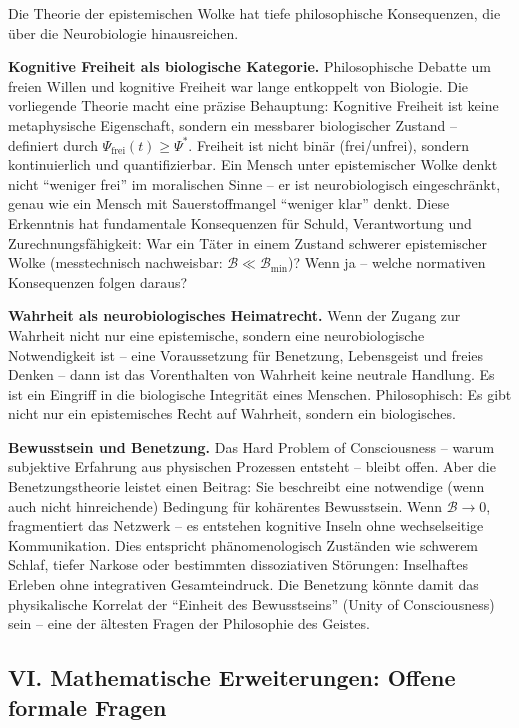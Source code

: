 ﻿\documentclass[12pt,a4paper]{report}
\theoremstyle{plain}
\theoremstyle{definition}
\theoremstyle{remark}
\begin{document}
	Die Theorie der epistemischen Wolke hat tiefe philosophische
	Konsequenzen, die über die Neurobiologie hinausreichen.

	\textbf{Kognitive Freiheit als biologische Kategorie.}
	Philosophische Debatte um freien Willen und kognitive Freiheit
	war lange entkoppelt von Biologie.
	Die vorliegende Theorie macht eine präzise Behauptung:
	Kognitive Freiheit ist keine metaphysische Eigenschaft,
	sondern ein messbarer biologischer Zustand -- definiert durch
	$\Psi_{\mathrm{frei}}(t) \geq \Psi^*$.
	Freiheit ist nicht binär (frei/unfrei), sondern kontinuierlich
	und quantifizierbar. Ein Mensch unter epistemischer Wolke
	denkt nicht ``weniger frei'' im moralischen Sinne --
	er ist neurobiologisch eingeschränkt, genau wie ein Mensch
	mit Sauerstoffmangel ``weniger klar'' denkt.
	Diese Erkenntnis hat fundamentale Konsequenzen für Schuld,
	Verantwortung und Zurechnungsfähigkeit:
	War ein Täter in einem Zustand schwerer epistemischer Wolke
	(messtechnisch nachweisbar: $\mathcal{B} \ll \mathcal{B}_{\min}$)?
	Wenn ja -- welche normativen Konsequenzen folgen daraus?

	\textbf{Wahrheit als neurobiologisches Heimatrecht.}
	Wenn der Zugang zur Wahrheit nicht nur eine epistemische,
	sondern eine neurobiologische Notwendigkeit ist --
	eine Voraussetzung für Benetzung, Lebensgeist und freies Denken --
	dann ist das Vorenthalten von Wahrheit keine neutrale Handlung.
	Es ist ein Eingriff in die biologische Integrität eines Menschen.
	Philosophisch: Es gibt nicht nur ein epistemisches Recht auf Wahrheit,
	sondern ein biologisches.

	\textbf{Bewusstsein und Benetzung.}
	Das Hard Problem of Consciousness -- warum subjektive Erfahrung
	aus physischen Prozessen entsteht -- bleibt offen.
	Aber die Benetzungstheorie leistet einen Beitrag:
	Sie beschreibt eine notwendige (wenn auch nicht hinreichende)
	Bedingung für kohärentes Bewusstsein.
	Wenn $\mathcal{B} \to 0$, fragmentiert das Netzwerk --
	es entstehen kognitive Inseln ohne wechselseitige Kommunikation.
	Dies entspricht phänomenologisch Zuständen wie schwerem Schlaf,
	tiefer Narkose oder bestimmten dissoziativen Störungen:
	Inselhaftes Erleben ohne integrativen Gesamteindruck.
	Die Benetzung könnte damit das physikalische Korrelat der
	``Einheit des Bewusstseins'' (Unity of Consciousness) sein --
	eine der ältesten Fragen der Philosophie des Geistes.

	\subsection*{VI. Mathematische Erweiterungen: Offene formale Fragen}
\end{document}
